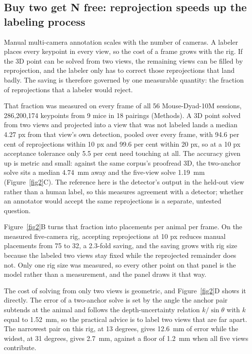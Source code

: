 \documentclass[pdflatex, sn-nature]{sn-jnl}
\theoremstyle{thmstyleone}%
\theoremstyle{thmstyletwo}%
\theoremstyle{thmstylethree}%
\begin{document}
\subsection{Buy two get N free: reprojection speeds up the labeling process}\label{subsec2-2}

Manual multi-camera annotation scales with the number of cameras. A labeler places every keypoint in every view, so the cost of a frame grows with the rig. If the 3D point can be solved from two views, the remaining views can be filled by reprojection, and the labeler only has to correct those reprojections that land badly. The saving is therefore governed by one measurable quantity: the fraction of reprojections that a labeler would reject.

That fraction was measured on every frame of all 56 Mouse-Dyad-10M sessions, 286,200,174 keypoints from 9 mice in 18 pairings (Methods). A 3D point solved from two views and projected into a view that was not labeled lands a median 4.27 px from that view's own detection, pooled over every frame, with 94.6 per cent of reprojections within 10 px and 99.6 per cent within 20 px, so at a 10 px acceptance tolerance only 5.5 per cent need touching at all. The accuracy given up is metric and small: against the same corpus's proofread 3D, the two-anchor solve sits a median 4.74~mm away and the five-view solve 1.19~mm (Figure~\ref{fig2}C). The reference here is the detector's output in the held-out view rather than a human label, so this measures agreement with a detector; whether an annotator would accept the same reprojections is a separate, untested question.

Figure~\ref{fig2}B turns that fraction into placements per animal per frame. On the measured five-camera rig, accepting reprojections at 10 px reduces manual placements from 75 to 32, a 2.3-fold saving, and the saving grows with rig size because the labeled two views stay fixed while the reprojected remainder does not. Only one rig size was measured, so every other point on that panel is the model rather than a measurement, and the panel draws it that way.

The cost of solving from only two views is geometric, and Figure~\ref{fig2}D shows it directly. The error of a two-anchor solve is set by the angle the anchor pair subtends at the animal and follows the depth-uncertainty relation $k/\sin\theta$ with $k$ equal to 1.52~mm, so the practical advice is to label two views that are far apart. The narrowest pair on this rig, at 13 degrees, gives 12.6~mm of error while the widest, at 31 degrees, gives 2.7~mm, against a floor of 1.2~mm when all five views contribute.
\end{document}
